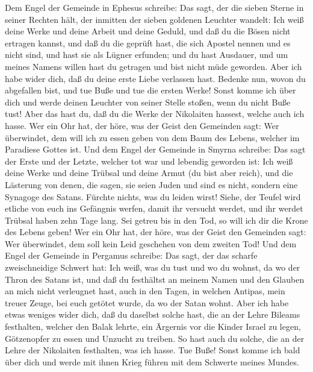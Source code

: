  Dem Engel der Gemeinde in Ephesus schreibe: Das sagt, der
die sieben Sterne in seiner Rechten hält, der inmitten der sieben
goldenen Leuchter wandelt:  Ich weiß deine Werke und deine
Arbeit und deine Geduld, und daß du die Bösen nicht ertragen kannst, und
daß du die geprüft hast, die sich Apostel nennen und es nicht sind, und
hast sie als Lügner erfunden;  und du hast Ausdauer, und
um meines Namens willen hast du getragen und bist nicht müde geworden.
 Aber ich habe wider dich, daß du deine erste Liebe
verlassen hast.  Bedenke nun, wovon du abgefallen bist,
und tue Buße und tue die ersten Werke! Sonst komme ich über dich und
werde deinen Leuchter von seiner Stelle stoßen, wenn du nicht Buße tust!
 Aber das hast du, daß du die Werke der Nikolaiten
hassest, welche auch ich hasse.  Wer ein Ohr hat, der
höre, was der Geist den Gemeinden sagt: Wer überwindet, dem will ich zu
essen geben von dem Baum des Lebens, welcher im Paradiese Gottes ist.
 Und dem Engel der Gemeinde in Smyrna schreibe: Das sagt
der Erste und der Letzte, welcher tot war und lebendig geworden ist:
 Ich weiß deine Werke und deine Trübsal und deine Armut
(du bist aber reich), und die Lästerung von denen, die sagen, sie seien
Juden und sind es nicht, sondern eine Synagoge des Satans.
 Fürchte nichts, was du leiden wirst! Siehe, der Teufel
wird etliche von euch ins Gefängnis werfen, damit ihr versucht werdet,
und ihr werdet Trübsal haben zehn Tage lang. Sei getreu bis in den Tod,
so will ich dir die Krone des Lebens geben!  Wer ein Ohr
hat, der höre, was der Geist den Gemeinden sagt: Wer überwindet, dem
soll kein Leid geschehen von dem zweiten Tod!  Und dem
Engel der Gemeinde in Pergamus schreibe: Das sagt, der das scharfe
zweischneidige Schwert hat:  Ich weiß, was du tust und wo
du wohnst, da wo der Thron des Satans ist, und daß du festhältst an
meinem Namen und den Glauben an mich nicht verleugnet hast, auch in den
Tagen, in welchen Antipas, mein treuer Zeuge, bei euch getötet wurde, da
wo der Satan wohnt.  Aber ich habe etwas weniges wider
dich, daß du daselbst solche hast, die an der Lehre Bileams festhalten,
welcher den Balak lehrte, ein Ärgernis vor die Kinder Israel zu legen,
Götzenopfer zu essen und Unzucht zu treiben.  So hast
auch du solche, die an der Lehre der Nikolaiten festhalten, was ich
hasse.  Tue Buße! Sonst komme ich bald über dich und
werde mit ihnen Krieg führen mit dem Schwerte meines Mundes.
